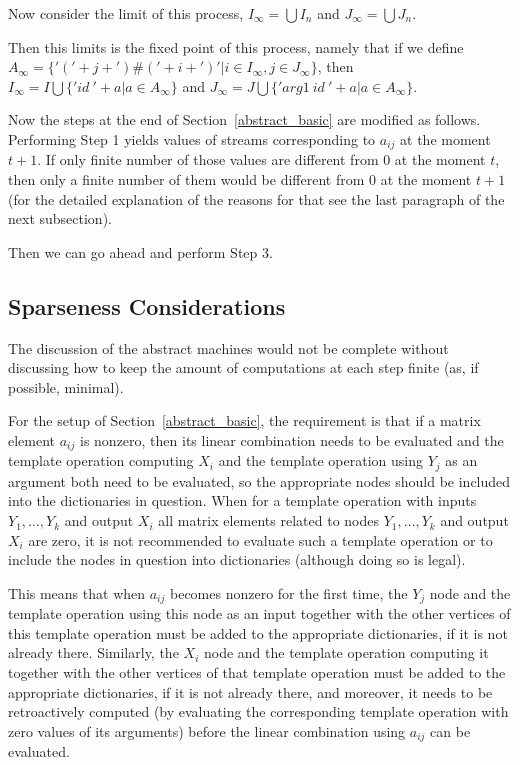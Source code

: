 \documentclass[withtimes]{easychair}
\begin{document}
Now consider the limit of this process, $I_{\infty} = \bigcup I_n$ and $J_{\infty} = \bigcup J_n$.

Then this limits is the fixed point of this process, namely that if we define\linebreak
$A_{\infty} = \{'('+j+')\#('+i+')' | i \in I_{\infty}, j \in J_{\infty}\}$, then
$I_{\infty} = I \bigcup \{'id\ '+ a | a \in A_{\infty}\}$ and $J_{\infty} = J \bigcup \{'arg1\ id\ '+ a | a \in A_{\infty}\}$.

Now the steps at the end of  Section~\ref{abstract_basic} are modified as follows.
Performing Step 1 yields values of streams corresponding to $a_{ij}$ at the moment $t+1$.
If only finite number of those values are different from 0 at the moment $t$, then only
a finite number of them would be different from 0 at the moment $t+1$ (for the detailed explanation
of the reasons for that see the last paragraph of the next subsection).

Then we can go ahead and perform Step 3.

\subsection{Sparseness Considerations}

The discussion of the abstract machines would not be complete without discussing how
to keep the amount of computations at each step finite (as, if possible, minimal).

For the setup of Section~\ref{abstract_basic}, the requirement is that if a matrix
element $a_{ij}$ is nonzero, then its linear combination needs to be evaluated and the
template operation computing $X_i$ and the template operation using $Y_j$ as an argument
both need to be evaluated, so the appropriate nodes should be included into the
dictionaries in question. When for a template operation with inputs $Y_1, \dots, Y_k$ and
output $X_i$ all matrix elements related to nodes $Y_1, \dots, Y_k$ and
output $X_i$ are zero, it is not recommended to evaluate such a template operation or
to include the nodes in question into dictionaries (although doing so is legal).

This means that when $a_{ij}$ becomes nonzero for the first time,
the $Y_j$ node and the template operation using this node as an input together with the other vertices
of this template operation must be added to the appropriate dictionaries, if it is not already there.
Similarly, the $X_i$ node and the template operation computing it together with the other vertices
of that template operation must be added to the appropriate dictionaries, if it is not already there,
and moreover, it needs to be retroactively computed (by evaluating the corresponding template operation
with zero values of its arguments) 
before the linear combination using  $a_{ij}$ can be evaluated.
\end{document}
